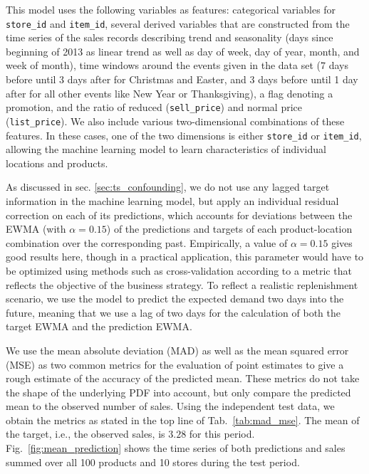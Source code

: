 \documentclass[BCOR=1mm, DIV=calc,10pt,
twoside=true,
twocolumn,
headings=normal]{scrartcl}
\newcommand{\fig}{Fig.~}
\newcommand{\tab}{Tab.~}
\begin{document}
\noindent
This model uses the following variables as features: categorical variables for \texttt{store\_id} and \texttt{item\_id}, several derived variables that are constructed from the time series of the sales records describing trend and seasonality (days since beginning of 2013 as linear trend as well as day of week, day of year, month, and week of month), time windows around the events given in the data set (7 days before until 3 days after for Christmas and Easter, and 3 days before until 1 day after for all other events like New Year or Thanksgiving), a flag denoting a promotion, and the ratio of reduced (\texttt{sell\_price}) and normal price (\texttt{list\_price}). We also include various two-dimensional combinations of these features. In these cases, one of the two dimensions is either \texttt{store\_id} or \texttt{item\_id}, allowing the machine learning model to learn characteristics of individual locations and products.

\noindent
As discussed in sec. \ref{sec:ts_confounding}, we do not use any lagged target information in the machine learning model, but apply an individual residual correction on each of its predictions, which accounts for deviations between the EWMA (with $\alpha=0.15$) of the predictions and targets of each product-location combination over the corresponding past. Empirically, a value of $\alpha=0.15$ gives good results here, though in a practical application, this parameter would have to be optimized using methods such as cross-validation according to a metric that reflects the objective of the business strategy. To reflect a realistic replenishment scenario, we use the model to predict the expected demand two days into the future, meaning that we use a lag of two days for the calculation of both the target EWMA and the prediction EWMA.

\noindent
We use the mean absolute deviation (MAD) as well as the mean squared error (MSE) as two common metrics for the evaluation of point estimates to give a rough estimate of the accuracy of the predicted mean. These metrics do not take the shape of the underlying PDF into account, but only compare the predicted mean to the observed number of sales. Using the independent test data, we obtain the metrics as stated in the top line of \tab \ref{tab:mad_mse}. The mean of the target, i.e., the observed sales, is $3.28$ for this period. \fig \ref{fig:mean_prediction} shows the time series of both predictions and sales summed over all 100 products and 10 stores during the test period.
\end{document}
